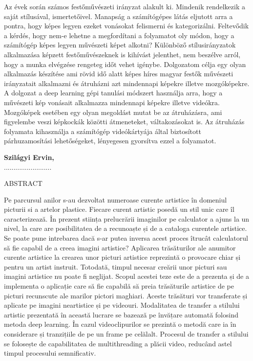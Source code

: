 \documentclass[12pt, a4paper, oneside]{book}
\theoremstyle{tetel}
\begin{document}
Az évek során számos festőművészeti irányzat alakult ki. Mindenik rendelkezik a saját stílusával, ismertetőivel. Manapság a számítógépes látás eljutott arra a pontra, hogy képes legyen ezeket vonásokat felismerni és kategorizálni. Feltevődik a kérdés, hogy nem-e lehetne a megfordítani a folyamatot oly módon, hogy a számítógép képes legyen művészeti képet alkotni?
\newline
\indent
Különböző stílusirányzatok alkalmazása képzett festőművészeknek is kihívást jelenthet, nem beszélve arról, hogy a munka elvégzése rengeteg időt vehet igénybe. Dolgozatom célja egy olyan alkalmazás készítése ami rövid idő alatt képes híres magyar festők művészeti irányzatait alkalmazni és átruházni azt mindennapi képekre illetve mozgóképekre.
\newline
\indent
A dolgozat a deep learning gépi tanulási módszert használja arra, hogy a művészeti kép vonásait alkalmazza mindennapi képekre illetve videókra. Mozgóképek esetében egy olyan megoldást mutat be az átruházásra, ami figyelembe veszi képkockák közötti átmeneteket, váltakozásokat is. Az átruházás folyamata kihasználja a számítógép videókártyája által biztosított párhuzamosítási lehetőségeket, lényegesen gyorsítva ezzel a folyamatot. 

\begin{flushright}
\textbf{Szilágyi Ervin,}\\
.........................
\end{flushright}

\newpage
\thispagestyle{empty}
\begin{center}
    \Large ABSTRACT
\end{center}

Pe parcursul anilor s-au dezvoltat numeroase curente artistice în domeniul picturii si a artelor plastice. Fiecare curent artistic posedă un stil unic care îl caracterizează. În prezent stiința prelucrării imaginilor pe calculator a ajuns la un nivel, la care are posibilitatea de a recunoaște și de a cataloga curentele artistice. Se poate pune intrebarea dacă s-ar putea inversa acest proces îtrucât calculatorul să fie capabil de a creea imagini artistice?
\newline
\indent
Aplicarea trăsăturilor ale anumitor curente artistice la crearea unor picturi artistice reprezintă o provocare chiar și pentru un artist instruit. Totodată, timpul necesar creării unor picturi sau imagini artistice nu poate fi neglijat. Scopul acestei teze este de a prezenta și de a implementa o aplicație care să fie capabilă să preia trăsăturile artistice de pe picturi recunscute ale marilor pictori maghiari. Aceste trăsături vor transferate și aplicate pe imagini neartistice și pe videouri.
\newline
\indent
Modalitatea de transfer a stilului artistic prezentată în această lucrare se bazează pe învățare automată folosind metoda deep learning. În cazul videoclipurilor se prezintă o metodă care ia în considerare și tranzițiile de pe un frame pe celălalt. Procesul de transfer a stilului se folosește de capabilitatea de multithreading a plăcii video, reducând astel timpul procesului semnificativ. 
\end{document}
